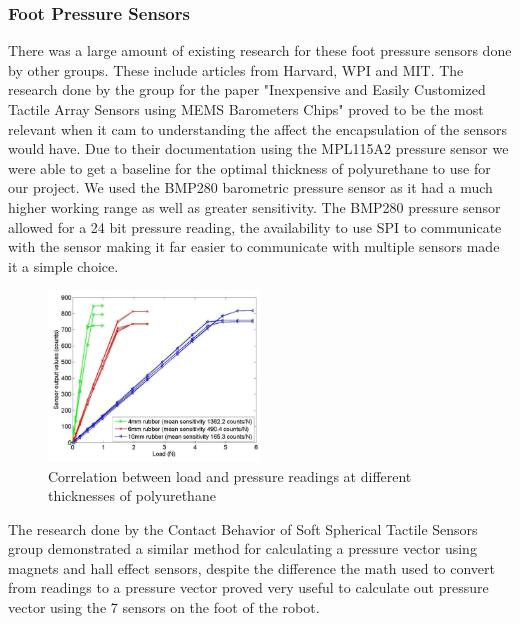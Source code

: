         \subsubsection{Foot Pressure Sensors}
        There was a large amount of existing research for these foot pressure sensors done by other groups. These include articles from Harvard\cite{chuah2012composite}\cite{chuah2014enabling}, WPI\cite{youssefian2014contact} and MIT\cite{tenzer2014inexpensive}. The research done by the group for the paper "Inexpensive and Easily Customized Tactile Array Sensors using MEMS Barometers Chips" \cite{chuah2012composite} proved to be the most relevant when it cam to understanding the affect the encapsulation of the sensors would have. Due to their documentation using the MPL115A2 pressure sensor we were able to get a baseline for the optimal thickness of polyurethane to use for our project. We used the BMP280 barometric pressure sensor \cite{BMP280} as it had a much higher working range as well as greater sensitivity. The BMP280 pressure sensor allowed for a 24 bit pressure reading, the availability to use SPI to communicate with the sensor making it far easier to communicate with multiple sensors made it a simple choice.
        \begin{figure}[H]
            \centering
            \includegraphics[width=0.5\textwidth]{figures/Load_vs_SensorvsThickness.png}
            \caption{Correlation between load and pressure readings at different thicknesses of polyurethane\cite{chuah2012composite}}
            \label{fig:ThicknessVSPressure}
        \end{figure}

        The research done by the Contact Behavior of Soft Spherical Tactile Sensors\cite{youssefian2014contact} group demonstrated a similar method for calculating a pressure vector using magnets and hall effect sensors, despite the difference the math used to convert from readings to a pressure vector proved very useful to calculate out pressure vector using the 7 sensors on the foot of the robot. 
